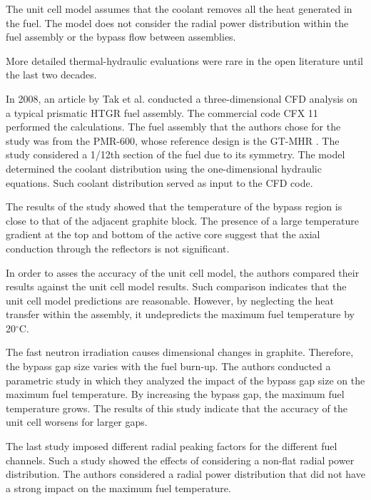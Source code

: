 \documentclass[11pt,letterpaper]{article}
\begin{document}
The unit cell model assumes that the coolant removes all the heat generated in the fuel.
The model does not consider the radial power distribution within the fuel assembly or the bypass flow between assemblies.







More detailed thermal-hydraulic evaluations were rare in the open literature until the last two decades.

In 2008, an article by Tak et al. \cite{tak_numerical_2008} conducted  a three-dimensional \gls{CFD} analysis on a typical prismatic HTGR fuel assembly.
The commercial code CFX 11 \cite{ansys_incorporated_cfx_2006} performed the calculations.
The fuel assembly that the authors chose for the study was from the PMR-600, whose reference design is the GT-MHR \cite{general_atomics_gas_1996}.
The study considered a 1/12th section of the fuel due to its symmetry.
The model determined the coolant distribution using the one-dimensional hydraulic equations.
Such coolant distribution served as input to the CFD code.

The results of the study showed that the temperature of the bypass region is close to that of the adjacent graphite block.
The presence of a large temperature gradient at the top and bottom of the active core suggest that the axial conduction through the reflectors is not significant.

In order to asses the accuracy of the unit cell model, the authors compared their results against the unit cell model results.
Such comparison indicates that the unit cell model predictions are reasonable.
However, by neglecting the heat transfer within the assembly, it undepredicts the maximum fuel temperature by 20$^{\circ}$C.

The fast neutron irradiation causes dimensional changes in graphite.
Therefore, the bypass gap size varies with the fuel burn-up.
The authors conducted a parametric study in which they analyzed the impact of the bypass gap size on the maximum fuel temperature.
By increasing the bypass gap, the maximum fuel temperature grows.
The results of this study indicate that the accuracy of the unit cell worsens for larger gaps.

The last study imposed different radial peaking factors for the different fuel channels.
Such a study showed the effects of considering a non-flat radial power distribution.
The authors considered a radial power distribution that did not have a strong impact on the maximum fuel temperature.
\end{document}
